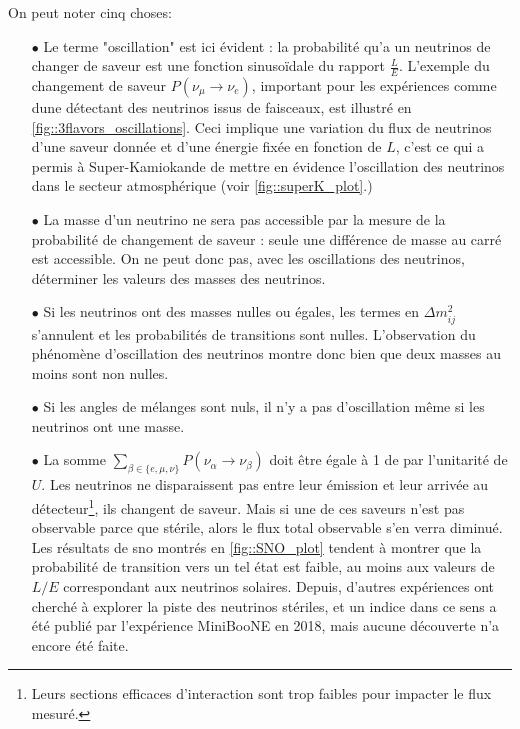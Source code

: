         On peut noter cinq choses:
        \begin{itemize}
          \item[$\bullet$] Le terme "oscillation" est ici évident : la probabilité qu'a un neutrinos de changer de saveur est une fonction sinusoïdale du rapport $\frac{L}{E}$. L'exemple du changement de saveur $P(\nu_{\mu}\to\nu_e)$, important pour les expériences comme \gls{dune} détectant des neutrinos issus de faisceaux, est illustré en \autoref{fig::3flavors_oscillations}. Ceci implique une variation du flux de neutrinos d'une saveur donnée et d'une énergie fixée en fonction de $L$, c'est ce qui a permis à Super-Kamiokande de mettre en évidence l'oscillation des neutrinos dans le secteur atmosphérique (voir \autoref{fig::superK_plot}.)
          \item[$\bullet$] La masse d'un neutrino ne sera pas accessible par la mesure de la probabilité de changement de saveur : seule une différence de masse au carré est accessible. On ne peut donc pas, avec les oscillations des neutrinos, déterminer les valeurs des masses des neutrinos.
          \item[$\bullet$] Si les neutrinos ont des masses nulles ou égales, les termes en $\Delta m_{ij}^2$ s'annulent et les probabilités de transitions sont nulles. L'observation du phénomène d'oscillation des neutrinos montre donc bien que deux masses au moins sont non nulles.
          \item[$\bullet$] Si les angles de mélanges sont nuls, il n'y a pas d'oscillation même si les neutrinos ont une masse.
          \item[$\bullet$] La somme $\sum_{\beta\in\{e,\mu,\nu\}}P(\nu_{\alpha}\to\nu_{\beta})$ doit être égale à 1 de par l'unitarité de $U$. Les neutrinos ne disparaissent pas entre leur émission et leur arrivée au détecteur\footnote{Leurs sections efficaces d'interaction sont trop faibles pour impacter le flux mesuré.}, ils changent de saveur. Mais si une de ces saveurs n'est pas observable parce que stérile, alors le flux total observable s'en verra diminué. Les résultats de \gls{sno} montrés en \autoref{fig::SNO_plot} tendent à montrer que la probabilité de transition vers un tel état est faible, au moins aux valeurs de $L/E$ correspondant aux neutrinos solaires. Depuis, d'autres expériences ont cherché à explorer la piste des neutrinos stériles, et un indice dans ce sens a été publié par l'expérience MiniBooNE\cite{Arevalo2018} en 2018, mais aucune découverte n'a encore été faite.
        \end{itemize}



